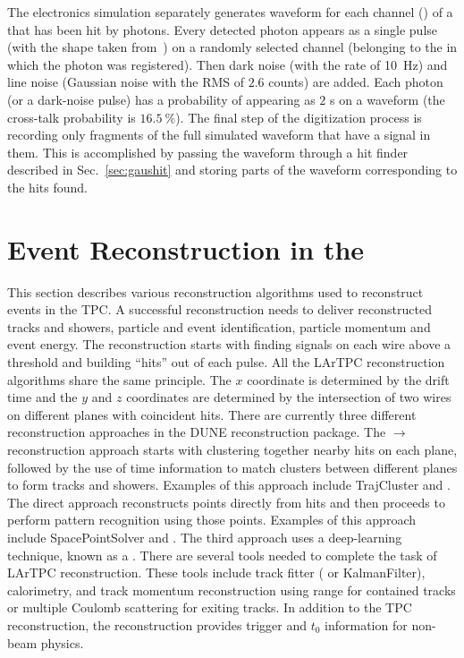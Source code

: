 The  electronics simulation separately generates waveform 
for each channel () of a  that has been hit by photons.
Every detected photon %
appears as a single \phel{} pulse
(with the shape taken from~\cite{http://lss.fnal.gov/archive/2015/pub/fermilab-pub-15-488-nd-ppd.pdf:2015gov}) on a randomly selected channel
(belonging to the  in which the photon was registered).
Then dark noise (with the rate of \SI{10}{Hz}) and 
line noise (Gaussian noise with the RMS of $2.6$  counts) are added.
Each photon (or a dark-noise pulse) has a probability of appearing
as $2$ \phel{}s on a waveform (the cross-talk probability is $16.5~\%$).
The final step of the digitization process is recording only fragments
of the full simulated waveform that have a signal in them.
This is accomplished by passing the waveform through a hit finder
described in Sec.~\ref{sec:gaushit} 
and storing parts of the waveform corresponding to the hits found.


\section{Event Reconstruction in the }
\label{sec:tools-fdreco}

This section describes various reconstruction algorithms used to reconstruct events in the  TPC. A successful \lartpc reconstruction needs to deliver reconstructed tracks and showers, particle and event identification, particle momentum and event energy. The reconstruction starts with finding signals on each wire above a threshold and building ``hits'' out of each pulse. All the LArTPC \threed reconstruction algorithms share the same principle. The $x$ coordinate is determined by the drift time and the $y$ and $z$ coordinates are determined by the intersection of two wires on different planes with coincident hits. There are currently three different reconstruction approaches in the DUNE reconstruction package. The \twod$\rightarrow$\threed reconstruction approach starts with clustering together nearby hits on each plane, %
followed by the use of time information to match \twod clusters between different planes to form \threed tracks and showers. Examples of this approach include TrajCluster and .  The direct \threed approach reconstructs \threed points directly from hits and then proceeds to perform pattern recognition using those \threed points. Examples of this approach include SpacePointSolver and . The third approach uses a deep-learning technique, known as a . There are several tools needed to complete the task of LArTPC reconstruction. These tools include track fitter ( or KalmanFilter), calorimetry,  and track momentum reconstruction using range for contained tracks or multiple Coulomb scattering for exiting tracks. In addition to the TPC reconstruction, the  reconstruction provides trigger and $t_0$ information for non-beam physics. 

